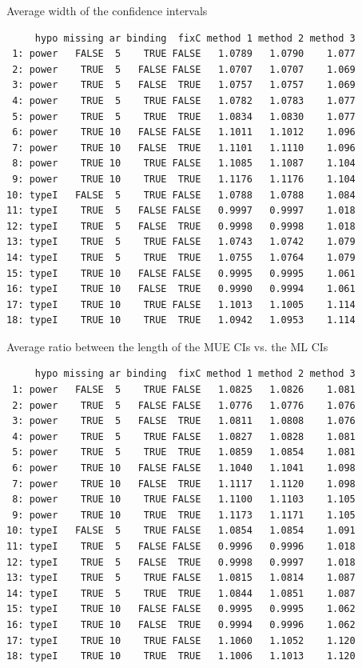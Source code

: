 \documentclass[12pt]{article}
\begin{document}
Average width of the confidence intervals
\begin{verbatim}
     hypo missing ar binding  fixC method 1 method 2 method 3
 1: power   FALSE  5    TRUE FALSE   1.0789   1.0790    1.077
 2: power    TRUE  5   FALSE FALSE   1.0707   1.0707    1.069
 3: power    TRUE  5   FALSE  TRUE   1.0757   1.0757    1.069
 4: power    TRUE  5    TRUE FALSE   1.0782   1.0783    1.077
 5: power    TRUE  5    TRUE  TRUE   1.0834   1.0830    1.077
 6: power    TRUE 10   FALSE FALSE   1.1011   1.1012    1.096
 7: power    TRUE 10   FALSE  TRUE   1.1101   1.1110    1.096
 8: power    TRUE 10    TRUE FALSE   1.1085   1.1087    1.104
 9: power    TRUE 10    TRUE  TRUE   1.1176   1.1176    1.104
10: typeI   FALSE  5    TRUE FALSE   1.0788   1.0788    1.084
11: typeI    TRUE  5   FALSE FALSE   0.9997   0.9997    1.018
12: typeI    TRUE  5   FALSE  TRUE   0.9998   0.9998    1.018
13: typeI    TRUE  5    TRUE FALSE   1.0743   1.0742    1.079
14: typeI    TRUE  5    TRUE  TRUE   1.0755   1.0764    1.079
15: typeI    TRUE 10   FALSE FALSE   0.9995   0.9995    1.061
16: typeI    TRUE 10   FALSE  TRUE   0.9990   0.9994    1.061
17: typeI    TRUE 10    TRUE FALSE   1.1013   1.1005    1.114
18: typeI    TRUE 10    TRUE  TRUE   1.0942   1.0953    1.114
\end{verbatim}

Average ratio between the length of the MUE CIs vs. the ML CIs
\begin{verbatim}
     hypo missing ar binding  fixC method 1 method 2 method 3
 1: power   FALSE  5    TRUE FALSE   1.0825   1.0826    1.081
 2: power    TRUE  5   FALSE FALSE   1.0776   1.0776    1.076
 3: power    TRUE  5   FALSE  TRUE   1.0811   1.0808    1.076
 4: power    TRUE  5    TRUE FALSE   1.0827   1.0828    1.081
 5: power    TRUE  5    TRUE  TRUE   1.0859   1.0854    1.081
 6: power    TRUE 10   FALSE FALSE   1.1040   1.1041    1.098
 7: power    TRUE 10   FALSE  TRUE   1.1117   1.1120    1.098
 8: power    TRUE 10    TRUE FALSE   1.1100   1.1103    1.105
 9: power    TRUE 10    TRUE  TRUE   1.1173   1.1171    1.105
10: typeI   FALSE  5    TRUE FALSE   1.0854   1.0854    1.091
11: typeI    TRUE  5   FALSE FALSE   0.9996   0.9996    1.018
12: typeI    TRUE  5   FALSE  TRUE   0.9998   0.9997    1.018
13: typeI    TRUE  5    TRUE FALSE   1.0815   1.0814    1.087
14: typeI    TRUE  5    TRUE  TRUE   1.0844   1.0851    1.087
15: typeI    TRUE 10   FALSE FALSE   0.9995   0.9995    1.062
16: typeI    TRUE 10   FALSE  TRUE   0.9994   0.9996    1.062
17: typeI    TRUE 10    TRUE FALSE   1.1060   1.1052    1.120
18: typeI    TRUE 10    TRUE  TRUE   1.1006   1.1013    1.120
\end{verbatim}
\end{document}
